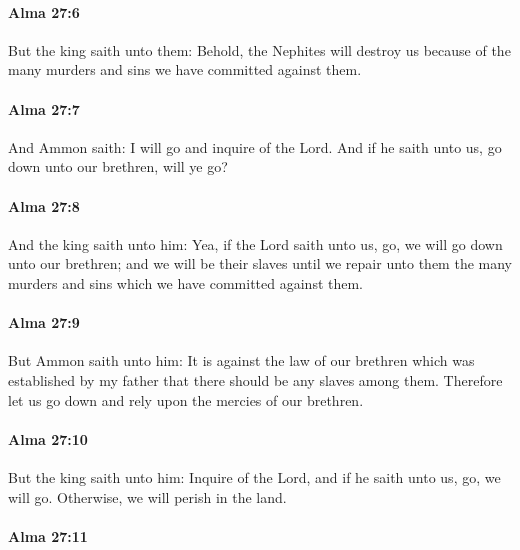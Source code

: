 		\paragraph{Alma 27:6} %
			\label{ALMA-27-6}

			But the king saith unto them:
			Behold, the Nephites will destroy us
			because of the many murders and sins we have committed against them.

		\paragraph{Alma 27:7} %
			\label{ALMA-27-7}

			And Ammon saith:
			I will go and inquire of the Lord.
			And if he saith unto us, go down unto our brethren, will ye go?

		\paragraph{Alma 27:8} %
			\label{ALMA-27-8}

			And the king saith unto him:
			Yea, if the Lord saith unto us, go, we will go down unto our brethren;
			and we will be their slaves
			until we repair unto them the many murders and sins
			which we have committed against them.

		\paragraph{Alma 27:9} %
			\label{ALMA-27-9}

			But Ammon saith unto him:
			It is against the law of our brethren which was established by my father
			that there should be any slaves among them.
			Therefore let us go down and rely upon the mercies of our brethren.

		\paragraph{Alma 27:10} %
			\label{ALMA-27-10}

			But the king saith unto him:
			Inquire of the Lord,
			and if he saith unto us, go, we will go.
			Otherwise, we will perish in the land.

		\paragraph{Alma 27:11} %
			\label{ALMA-27-11}

